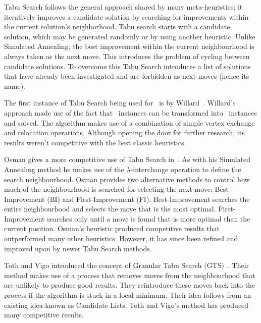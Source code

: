 Tabu Search follows the general approach shared by many meta-heuristics; it iteratively improves a candidate solution by searching for improvements within the current solution's neighborhood. Tabu search starts with a candidate solution, which may be generated randomly or by using another heuristic. Unlike Simulated Annealing, the best improvement within the current neighbourhood is always taken as the next move. This introduces the problem of cycling between candidate solutions. To overcome this Tabu Search introduces a list of solutions that have already been investigated and are forbidden as next moves (hence its name).

The first instance of Tabu Search being used for \VRP\ is by Willard~\cite{Willard:1989}. Willard's approach made use of the fact that \VRP\ instances can be transformed into \MTSP\ instances and solved. The algorithm makes use of a combination of simple vertex exchange and relocation operations. Although opening the door for further research, its results weren't competitive with the best classic heuristics. 

Osman gives a more competitive use of Tabu Search in~\cite{Osman:1993}. As with his Simulated Annealing method he makes use of the $\lambda$-interchange operation to define the search neighbourhood. Osman provides two alternative methods to control how much of the neighbourhood is searched for selecting the next move: Best-Improvement (BI) and First-Improvement (FI). Best-Improvement searches the entire neighbourhood and selects the move that is the most optimal. First-Improvement searches only until a move is found that is more optimal than the current position. Osman's heuristic produced competitive results that outperformed many other heuristics. However, it has since been refined and improved upon by newer Tabu Search methods.

Toth and Vigo introduced the concept of Granular Tabu Search (GTS)~\cite{GHL:1998}. Their method makes use of a process that removes moves from the neighbourhood that are unlikely to produce good results. They reintroduce these moves back into the process if the algorithm is stuck in a local minimum. Their idea follows from an existing idea known as Candidate Lists. Toth and Vigo's method has produced many competitive results.

